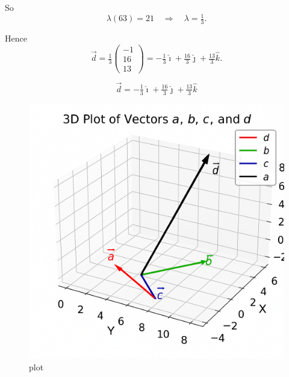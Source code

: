 \documentclass[journal]{IEEEtran}
\begin{document}
So
\[
\lambda(63)=21 \quad\Rightarrow\quad \lambda=\tfrac{1}{3}.
\]

Hence
\[
\vec d = \tfrac{1}{3}\begin{pmatrix}-1\\16\\13\end{pmatrix}
= -\tfrac{1}{3}\hat\imath + \tfrac{16}{3}\hat\jmath + \tfrac{13}{3}\hat k.
\]

\[
\boxed{\vec d = -\tfrac{1}{3}\hat\imath + \tfrac{16}{3}\hat\jmath + \tfrac{13}{3}\hat k}
\]
\begin{figure}
    \centering
    \includegraphics[width=0.5\linewidth]{figs/plot.png}
    \caption{plot}
    \label{fig:placeholder}
\end{figure}
\end{document}
